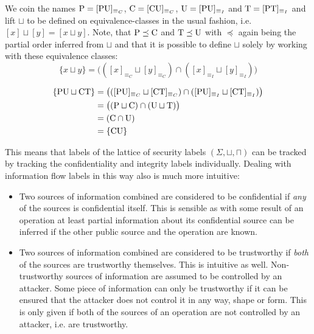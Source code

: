 We coin the names $ \text{P} = [\text{PU}]_{\equiv_C} $, $ \text{C} = [\text{CU}]_{\equiv_C} $, $ \text{U} = [\text{PU}]_{\equiv_I} $ and $ \text{T} = [\text{PT}]_{\equiv_I} $ and lift $ \sqcup $ to be defined on equivalence-classes in the usual fashion, i.e. $ [x] \sqcup [y] = [x \sqcup y] $.
Note, that $ \text{P} \preceq \text{C} $ and $ \text{T} \preceq \text{U} $ with $ \preceq $ again being the partial order inferred from $ \sqcup $ and that it is possible to define $ \sqcup $ solely by working with these equivalence classes:
\begin{equation*}
    \{ x \sqcup y \} = \big(([x]_{\equiv_C} \sqcup [y]_{\equiv_C}) \cap ([x]_{\equiv_I} \sqcup [y]_{\equiv_I}) \big)
\end{equation*}

\begin{example}
    \begin{align*}
        \{ \text{PU} \sqcup \text{CT} \} &= \big(([\text{PU}]_{\equiv_C} \sqcup [\text{CT}]_{\equiv_C}) \cap ([\text{PU}]_{\equiv_I} \sqcup [\text{CT}]_{\equiv_I}) \big) \\
        &= \big((\text{P} \sqcup \text{C}) \cap (\text{U} \sqcup \text{T}) \big) \\
        &= (\text{C} \cap \text{U}) \\
        &= \{ \text{CU} \}
    \end{align*}
\end{example}

This means that labels of the lattice of security labels $ (\Sigma, \sqcup, \sqcap) $ can be tracked by tracking the confidentiality and integrity labels individually.
Dealing with information flow labels in this way also is much more intuitive:
\begin{itemize}
    \item Two sources of information combined are considered to be confidential if \textit{any} of the sources is confidential itself.
    This is sensible as with some result of an operation at least partial information about its confidential source can be inferred if the other public source and the operation are known.
    \item Two sources of information combined are considered to be trustworthy if \textit{both} of the sources are trustworthy themselves.
    This is intuitive as well.
    Non-trustworthy sources of information are assumed to be controlled by an attacker.
    Some piece of information can only be trustworthy if it can be ensured that the attacker does not control it in any way, shape or form.
    This is only given if both of the sources of an operation are not controlled by an attacker, i.e. are trustworthy.
\end{itemize}

